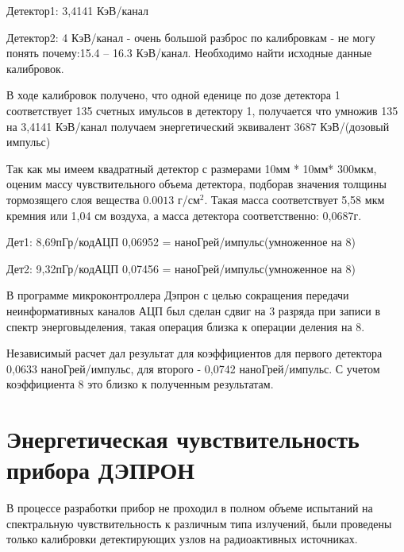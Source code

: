 Детектор1: 3,4141 КэВ/канал 

Детектор2: 4 КэВ/канал - очень большой разброс по калибровкам - не могу понять почему:15.4 – 16.3 КэВ/канал. Необходимо найти исходные данные калибровок.

В ходе калибровок получено, что одной еденице по дозе детектора 1 соответствует 135 счетных имульсов в детектору 1, получается что умножив 135 на 3,4141  КэВ/канал  получаем энергетический эквивалент 3687 КэВ/(дозовый импульс) 

Так как мы имеем квадратный детектор с размерами 10мм * 10мм* 300мкм, оценим массу чувствительного объема детектора, подборав значения толщины тормозящего слоя вещества $ 0.0013 $ г/см$^2 $. Такая масса соответствует 5,58 мкм кремния или 1,04 см воздуха, а масса детектора соответственно: 0,0687г.

Дет1: 8,69пГр/кодАЦП  0,06952 = наноГрей/импульс(умноженное на 8)

Дет2: 9,32пГр/кодАЦП  0,07456 = наноГрей/импульс(умноженное на 8)


В программе микроконтроллера Дэпрон с целью сокращения передачи неинформативных 
каналов АЦП был сделан сдвиг на 3 разряда при записи в спектр энерговыделения, 
такая операция близка к операции деления на 8.

Независимый расчет дал результат для коэффициентов для первого детектора 
0,0633  наноГрей/импульс, для второго -  0,0742 наноГрей/импульс. С учетом 
коэффициента 8 это близко к полученным результатам.

\section{Энергетическая чувствительность прибора ДЭПРОН}

В процессе разработки прибор не проходил в полном объеме испытаний на 
спектральную чувствительность к различным типа излучений, были проведены только 
калибровки детектирующих узлов на радиоактивных источниках. 

